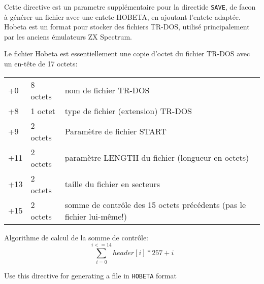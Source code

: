 \begin{xfr}
Cette directive est un parametre supplémentaire pour la directide \texttt{SAVE}, de facon à générer un fichier avec une entete HOBETA, en ajoutant l'entete adaptée.
Hobeta est un format pour stocker des fichiers TR-DOS, utilisé principalement par les anciens émulateurs ZX Spectrum. 

Le fichier Hobeta est essentiellement une copie d'octet du fichier TR-DOS avec un en-tête de 17 octets:
\begin{tabular}{lll}
+0  & 8 octets & nom de fichier TR-DOS \\
+8  & 1 octet  & type de fichier (extension) TR-DOS \\
+9  & 2 octets & Paramètre de fichier START \\
+11 & 2 octets & paramètre LENGTH du fichier (longueur en octets) \\
+13 & 2 octets & taille du fichier en secteurs \\
+15 & 2 octets & somme de contrôle des 15 octets précédents (pas le fichier lui-même!) \\
\end{tabular}


Algorithme de calcul de la somme de contrôle:
\[ \sum_{i=0}^{i<=14}{header[i]*257+i} \]


\end{xfr}

\begin{xen}
Use this directive for generating a file in \texttt{HOBETA} format
\end{xen}




